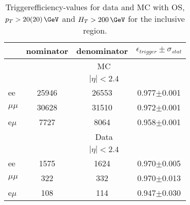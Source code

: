 
\begin{table}[hbp] \caption{Triggerefficiency-values for data and MC with OS, $p_T>20(20)\,\GeV$ and $H_T>200\,\GeV$ for the inclusive region.} 
\centering 
\renewcommand{\arraystretch}{1.2} 
\begin{tabular}{|l|c|c|c|}     
\hline    
 & nominator & denominator & $\epsilon_{trigger} \pm \sigma_{stat}$ \\    
\hline\hline
& \multicolumn{3}{|c|}{MC} \\
\hline
& \multicolumn{3}{|c|}{$|\eta|<2.4$ } \\
\hline 
ee & 25946 & 26553 & 0.977$\pm$0.001 \\
$\mu\mu$ & 30628 & 31510 & 0.972$\pm$0.001 \\
e$\mu$ & 7727 & 8064 & 0.958$\pm$0.001 \\
    
    \hline 
&\multicolumn{3}{|c|}{Data} \\
\hline
& \multicolumn{3}{|c|}{$|\eta|<2.4$ } \\
\hline
ee & 1575 & 1624 & 0.970$\pm$0.005 \\
$\mu\mu$ & 322 & 332 & 0.970$\pm$0.013 \\
e$\mu$ & 108 & 114 & 0.947$\pm$0.030 \\
 
 \hline     
\end{tabular}  
\label{tab:EffValues_Inclusive}
\end{table}
